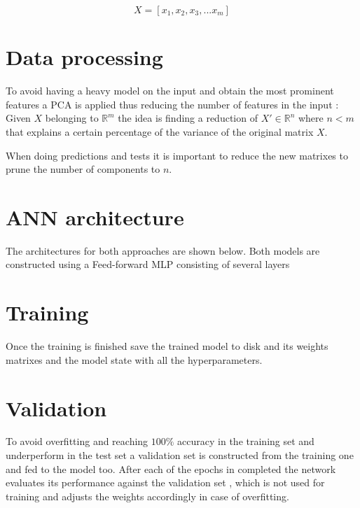 $$X = [x_1, x_2, x_3, ... x_m]$$


\section{Data processing}
\label{data processing}

To avoid having a heavy model on the input and obtain the most prominent features a PCA is applied thus reducing the number of features in the input \cite{pca} \cite{Minka2001}: 
Given $X$ belonging to $\mathbb{R}^m$ the idea is finding a reduction of $ X' \in \mathbb{R}^n$ where $n < m$ that explains a certain percentage of the variance of the original matrix $X$.

When doing predictions and tests it is important to reduce the new matrixes to prune the number of components to $n$. 


\section{ANN architecture}
The architectures for both approaches are shown below. 
Both models are constructed using a Feed-forward MLP consisting of several layers




\section{Training}
\label{training phase}

Once the training is finished save the trained model to disk and its weights matrixes and the model state with all the hyperparameters.

\section{Validation}
To avoid overfitting and reaching $100\%$ accuracy in the training set and underperform in the test set a validation set is constructed from the training one and fed to the model too.
After each of the epochs in completed the network evaluates its performance against the validation set , which is not used for training and adjusts the weights accordingly in case of overfitting.

